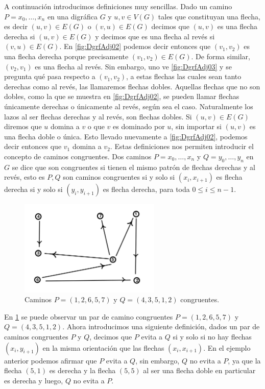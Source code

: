 A continuación introducimos definiciones muy sencillas. Dado un camino $P=x_0,\dots,x_n$ en una digráfica $G$ y $u,v \in V(G)$ tales que constituyan una flecha, es decir $(u,v) \in E(G)$ o $(v,u) \in E(G)$ decimos que  $(u,v)$ es una flecha derecha si $(u,v) \in E(G)$ y decimos que es una flecha al revés si $(v,u) \in E(G)$. En \cref{fig:DgrfAdj02} podemos decir entonces que $(v_1,v_2)$ es una flecha derecha porque precisamente $(v_1,v_2) \in E(G)$. De forma similar, $(v_2,v_1)$ es una flecha al revés. Sin embargo, uno ve \cref{fig:DgrfAdj03} y se pregunta qué pasa respecto a $(v_1,v_2)$, a estas flechas las cuales sean tanto derechas como al revés, las llamaremos flechas dobles. Aquellas flechas que no son dobles, como la que se muestra en \cref{fig:DgrfAdj02}, se pueden llamar flechas únicamente derechas o únicamente al revés, según sea el caso. Naturalmente los lazos al ser flechas derechas y al revés, son flechas dobles. Si $(u,v)\in E(G)$ diremos que $u$ domina a $v$ o que $v$ es dominado por $u$, sin importar si $(u,v)$ es una flecha doble o única. Esto llevado nuevamente a \cref{fig:DgrfAdj02}, podemos decir entonces que $v_1$ domina a $v_2$. Estas definiciones nos permiten introducir el concepto de caminos congruentes. Dos caminos $P=x_0, \dots, x_n$ y $Q=y_0, \dots, y_n$ en $G$ se dice que son congruentes si tienen el mismo patrón de flechas derechas y al revés, esto es $P,Q$ son caminos congruentes si y solo si $( x_i,x_{i+1})$ es flecha derecha si y solo si $(y_i, y_{i+1})$ es flecha derecha, para toda $0\leq i \leq n-1 $.

\begin{figure}[H]
  \centering
  \includegraphics[width=0.6\textwidth]{recursos/capturas/CaminoCngrnt.jpg}
  \caption{Caminos $P=(1,2,6,5,7)$ y $Q=(4,3,5,1,2)$ congruentes.}
  \label{fig:CaminoCngrnt}
\end{figure}

En \cref{fig:CaminoCngrnt} se puede observar un par de camino congruentes $P=(1,2,6,5,7)$ y $Q=(4,3,5,1,2)$. Ahora introducimos una siguiente definición, dados un par de caminos congruentes $P$ y $Q$, decimos que $P$ evita a $Q$ si y solo si no hay flechas $(x_i,y_{i+1})$ en la misma orientación que las flechas $(x_i,x_{i+1})$. En el ejemplo anterior podemos afirmar que $P$ evita a $Q$, sin embargo, $Q$ no evita a $P$, ya que la flecha $(5,1)$ es derecha y la flecha $(5,5)$ al ser una flecha doble en particular es derecha y luego, $Q$ no evita a $P$.

